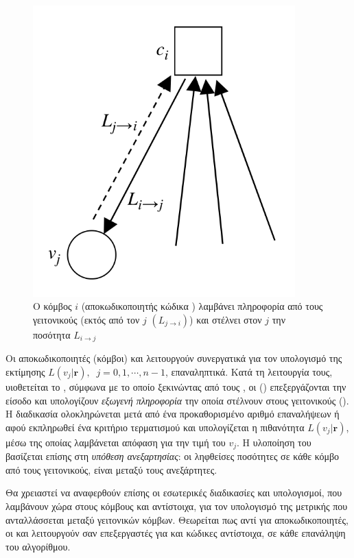 \begin{figure}[h]
\begin{minipage}{0.45\textwidth}
        \centering
        \includegraphics[width=0.9\textwidth]{figures/CN.png}
        \caption{Ο κόμβος  $i$ (αποκωδικοποιητής κώδικα ) λαμβάνει πληροφορία από τους γειτονικούς  (εκτός από τον $j$ $(L_{j\to i})$) και στέλνει στον  $j$ την ποσότητα $L_{i\to j}$}
        \label{fig:CN}
    \end{minipage}
\end{figure}

Οι αποκωδικοποιητές (κόμβοι)  και  λειτουργούν συνεργατικά για τον υπολογισμό της εκτίμησης $L(v_j|\mathbf{r}),\;\;j=0,1,\cdots,n-1$, επαναληπτικά. Κατά τη λειτουργία τους, υιοθετείται το , σύμφωνα με το οποίο ξεκινώντας από τους , οι  () επεξεργάζονται την είσοδο και υπολογίζουν \textit{εξωγενή πληροφορία} την οποία στέλνουν στους γειτονικούς  (). Η διαδικασία ολοκληρώνεται μετά από ένα προκαθορισμένο αριθμό επαναλήψεων ή αφού εκπληρωθεί ένα κριτήριο τερματισμού και υπολογίζεται η πιθανότητα $L(v_j|\mathbf{r})$, μέσω της οποίας λαμβάνεται απόφαση για την τιμή του  $v_j$. Η υλοποίηση του  βασίζεται επίσης στη \textit{υπόθεση ανεξαρτησίας}: οι ληφθείσες ποσότητες  σε κάθε κόμβο από τους γειτονικούς, είναι μεταξύ τους ανεξάρτητες.

Θα χρειαστεί να αναφερθούν επίσης οι εσωτερικές διαδικασίες και υπολογισμοί, που λαμβάνουν χώρα στους κόμβους  και  αντίστοιχα, για τον υπολογισμό της μετρικής  που ανταλλάσσεται μεταξύ γειτονικών κόμβων. Θεωρείται πως αντί για  αποκωδικοποιητές, οι  και  λειτουργούν σαν  επεξεργαστές για  και  κώδικες αντίστοιχα, σε κάθε επανάληψη του αλγορίθμου.

